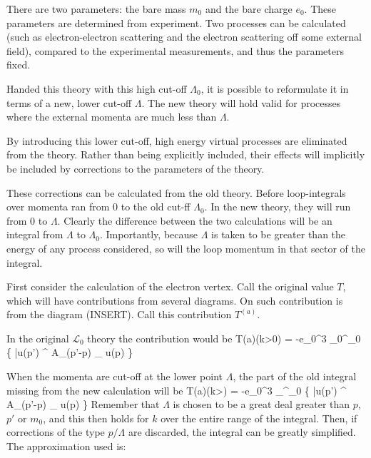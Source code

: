 There are two parameters: the bare mass $m_0$ and the bare charge $e_0$.  These parameters are determined from experiment.  Two processes can be calculated (such as electron-electron scattering and the electron scattering off some external field), compared to the experimental measurements, and thus the parameters fixed.

Handed this theory with this high cut-off $\Lambda_0$, it is possible to reformulate it in terms of a new, lower cut-off $\Lambda$.  The new theory will hold valid for processes where the external momenta are much less than $\Lambda$.	

By introducing this lower cut-off, high energy virtual processes are eliminated from the theory.  Rather than being explicitly included, their effects will implicitly be included by corrections to the parameters of the theory.

These corrections can be calculated from the old theory.  Before loop-integrals over momenta ran from $0$ to the old cut-ff $\Lambda_0$.  In the new theory, they will run from $0$ to $\Lambda$.  Clearly the difference between the two calculations will be an integral from $\Lambda$ to $\Lambda_0$.  Importantly, because $\Lambda$ is taken to be greater than the energy of any process considered, so will the loop momentum in that sector of the integral.

First consider the calculation of the electron vertex.  Call the original value $T$, which will have contributions from several diagrams.  On such contribution is from the diagram (INSERT).  Call this contribution $T^{(a)}$.  

In the original $\mathcal{L}_0$ theory the contribution would be
\beq
	T{(a)}(k>0) = -e_0^3 \int_{0}^{\Lambda_0}   \left\{
		\bar{u}(p') \gamma^\mu {} A_{}(p'-p) \cdot \gamma {} \gamma_\mu
		u(p) \right\}
\eeq  


When the momenta are cut-off at the lower point $\Lambda$, the part of the old integral missing from the new calculation will be
\beq
	T{(a)}(k>\Lambda) = -e_0^3 \int_{\Lambda}^{\Lambda_0}   \left\{
		\bar{u}(p') \gamma^\mu {} A_{}(p'-p) \cdot \gamma {} \gamma_\mu
		u(p) \right\}
\eeq  
Remember that $\Lambda$ is chosen to be a great deal greater than $p$, $p'$ or $m_0$, and this then holds for $k$ over the entire range of the integral.  Then, if corrections of the type $p/\Lambda$ are discarded, the integral can be greatly simplified.  The approximation used is:

